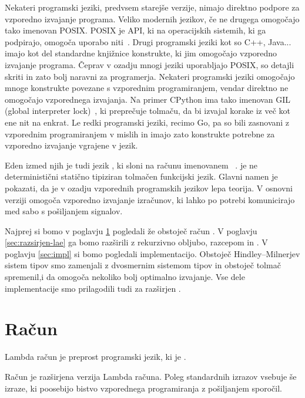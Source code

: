 \documentclass[12pt,a4paper,twoside]{article}
\newcommand\jR[1]{\todo[inline,color=jcyan]{#1 -JR}} %
\theoremstyle{definition} %
\theoremstyle{plain} %
\numberwithin{equation}{section}  %
\begin{document}
Nekateri programski jeziki, predvsem starejše verzije, nimajo direktno podpore za vzporedno izvajanje programa. 
Veliko modernih jezikov, če ne drugega omogočajo tako imenovan POSIX. POSIX je API, ki na operacijskih sistemih, ki ga podpirajo, omogoča uporabo niti~\cite{posix}.
Drugi programski jeziki kot so C++, Java... imajo kot del standardne knjižnice konstrukte, ki jim omogočajo vzporedno izvajanje programa. Čeprav v ozadju mnogi jeziki uporabljajo POSIX, so detajli skriti in zato bolj naravni za programerja. 
Nekateri programski jeziki omogočajo mnoge konstrukte povezane s vzporednim programiranjem, vendar direktno ne omogočajo vzporednega izvajanja. Na primer CPython ima tako imenovan GIL (global  interpreter lock)~\cite{gil}, ki preprečuje tolmaču, da bi izvajal korake iz več kot ene nit na enkrat.
Le redki programski jeziki, recimo Go, pa so bili zasnovani z vzporednim programiranjem v mislih in imajo zato konstrukte potrebne za vzporedno izvajanje vgrajene v jezik.


Eden izmed njih je tudi jezik \aeff{}, ki sloni na računu imenovanem \lae~\cite{aeff}. \aeff{} je ne deterministični statično tipiziran tolmačen funkcijski jezik. Glavni namen \lae{} je pokazati, da je v ozadju vzporednih programskih jezikov lepa teorija. V osnovni verziji \aeff{} omogoča vzporedno izvajanje izračunov, ki lahko po potrebi komunicirajo med sabo s pošiljanjem signalov. 


Najprej si bomo v poglavju \ref{sec:lae} pogledali že obstoječ račun \lae{}. V poglavju \ref{sec:razsirjen-lae} ga bomo razširili z rekurzivno obljubo, razcepom in \jR{Okvir}. V poglavju \ref{sec:impl} si bomo pogledali implementacijo. Obstoječ Hindley–Milnerjev sistem tipov smo zamenjali z dvosmernim sistemom tipov in obstoječ tolmač spremenil,i da omogoča nekoliko bolj optimalno izvajanje. Vse dele implementacije smo prilagodili tudi za razširjen \lae.



\section{Račun \lae{}}\label{sec:lae}

Lambda račun je preprost programski jezik, ki je \jR{Turing complete}.


Račun \lae je razširjena verzija Lambda računa. Poleg standardnih izrazov vsebuje še izraze, ki poosebijo bistvo vzporednega programiranja z pošiljanjem sporočil. 
\end{document}
